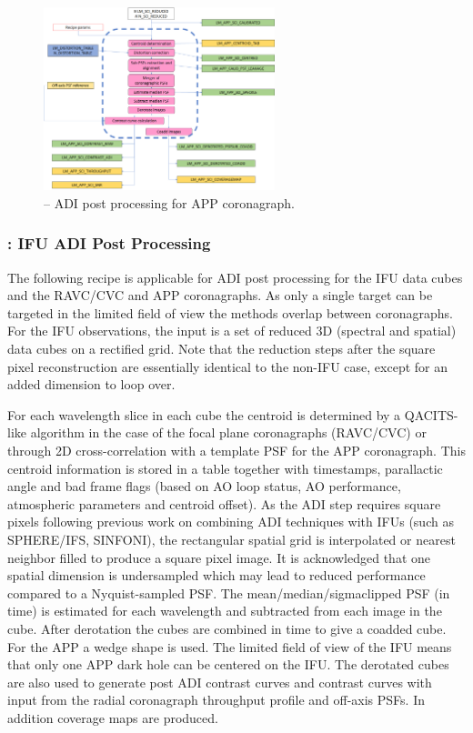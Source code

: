 \begin{figure}[hb]
  \centering
  \includegraphics[width=0.6\textwidth]{./figures/metis_lm_adi_app}
  \caption[Recipe: ]{ -- ADI post processing for APP coronagraph.
    }
  \label{fig:metis_lm_adi_app}
\end{figure}

\subsubsection{: IFU ADI Post Processing}
\label{sssec:adi_ifu}


The following recipe is applicable for ADI post processing for the IFU
data cubes and the RAVC/CVC and APP coronagraphs. As only a single
target can be targeted in the limited field of view the methods
overlap between coronagraphs.  For the IFU observations, the input is
a set of reduced 3D (spectral and spatial) data cubes on a rectified
grid. Note that the reduction steps after the square pixel reconstruction
are essentially identical to the non-IFU case, except for an added dimension
to loop over. 

For each wavelength slice in each cube the centroid is determined by a
QACITS-like algorithm in the case of the focal plane coronagraphs
(RAVC/CVC) or through 2D cross-correlation with a template PSF for the
APP coronagraph. This centroid information is stored in a table
together with timestamps, parallactic angle and bad frame flags (based
on AO loop status, AO performance, atmospheric parameters and centroid
offset).  As the ADI step requires square pixels following previous
work on combining ADI techniques with IFUs (such as SPHERE/IFS,
SINFONI), the rectangular spatial grid is interpolated or nearest
neighbor filled to produce a square pixel image.  It is acknowledged
that one spatial dimension is undersampled which may lead to reduced
performance compared to a Nyquist-sampled PSF.  The
mean/median/sigmaclipped PSF (in time) is estimated for each
wavelength and subtracted from each image in the cube.  After
derotation the cubes are combined in time to give a coadded cube. For
the APP a wedge shape is used. The limited field of view of the IFU
means that only one APP dark hole can be centered on the IFU. The derotated cubes
are also used to generate post ADI contrast curves and contrast curves
with input from the radial coronagraph throughput profile and off-axis
PSFs. In addition coverage maps are produced.

